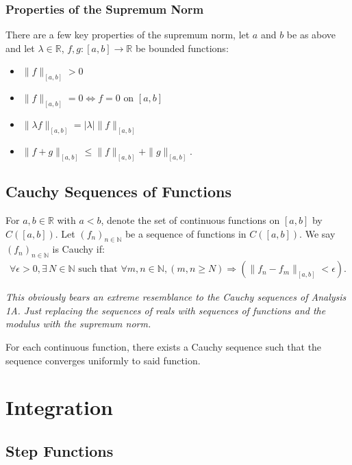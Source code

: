 \documentclass[a4paper, 12pt, twoside]{article}
\begin{document}
\subsubsection{Properties of the Supremum Norm}

There are a few key properties of the supremum norm, let $a$ and $b$
be as above and let $\lambda \in \mathbb{R}$, $f, g:[a, b]\to\mathbb{R}$
be bounded functions:

\begin{itemize}
      \item $\|f\|_{[a,b]} > 0$
      \item $\|f\|_{[a,b]} = 0 \Leftrightarrow f = 0 \text{ on } [a, b]$
      \item $\|\lambda f\|_{[a,b]} = |\lambda|\|f\|_{[a,b]}$
      \item $\|f+g\|_{[a,b]} \leq \|f\|_{[a,b]} + \|g\|_{[a,b]}.$
\end{itemize}

\subsection{Cauchy Sequences of Functions}

For $a, b \in \mathbb{R}$ with $a < b$, denote the set of continuous functions
on $[a,b]$ by $C([a,b])$. Let $(f_n)_{n\in \mathbb{N}}$ be a sequence of
functions in $C([a,b])$. We say $(f_n)_{n\in \mathbb{N}}$ is Cauchy if:
\begin{align*}
      \forall \epsilon > 0, \exists\,N \in \mathbb{N} \text{ such that }
      \forall m, n \in \mathbb{N}, (m, n \geq N) \Rightarrow (\|f_n - f_m\|_{[a,b]} <
      \epsilon).
\end{align*}

\textit{This obviously bears an extreme resemblance to the Cauchy sequences of
      Analysis 1A. Just replacing the sequences of reals with sequences of functions
      and the modulus with the supremum norm.}

\vspace{\baselineskip}

For each continuous function, there exists a Cauchy sequence such that the
sequence converges uniformly to said function.

\newpage

\section{Integration}

\subsection{Step Functions}
\end{document}
